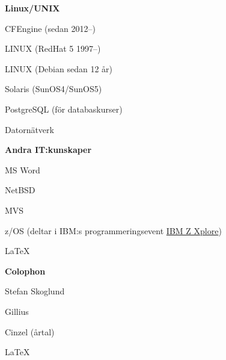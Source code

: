 \documentclass[a4paper,swedish,11pt]{article}
\begin{document}
\begin{minipage}[t]{0.73\textwidth}
  \textbf{Linux/UNIX}
  \begin{description}[nosep,font=\sffamily\bfseries]
    \small%
  \item CFEngine (sedan 2012--)
  \item LINUX (RedHat 5 1997--)
  \item LINUX (Debian sedan 12 år)
  \item Solaris (SunOS4/SunOS5)
  \item PostgreSQL (för databaskurser)
  \item Datornätverk
  \end{description}

  \textbf{Andra IT:kunskaper}
  \begin{description}[nosep,itemsep=0.1ex]
  \item MS Word
  \item NetBSD
  \item MVS
  \item z/OS (deltar i IBM:s programmeringsevent \href{https://ibmzxplore.influitive.com/forum/}{IBM Z Xplore})
  \item \LaTeX
  \end{description}
\end{minipage}
\begin{minipage}[t]{0.24\textwidth}
  \vspace{22cm}
  \textbf{Colophon}
  \begin{description}[nosep,itemsep=0.1ex]
    \setlength\itemsep{0.1ex}\small%
    \raggedleft%
  \item Stefan Skoglund {}
  \item Gillius
  \item Cinzel (årtal)
  \item \LaTeX%
  \end{description}%
\end{minipage}%
\end{document}
